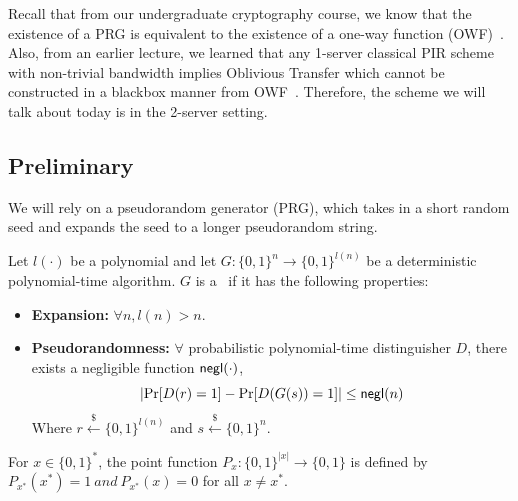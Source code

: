 Recall that 
from our undergraduate cryptography course, 
we know that the existence of a PRG
is equivalent to the existence of a one-way function (OWF)~\cite{haastad1999pseudorandom}.
Also, from an earlier lecture, we learned that any 1-server
classical PIR scheme 
with non-trivial bandwidth implies
Oblivious Transfer which cannot be constructed
in a blackbox manner from OWF~\cite{IR89}. 
Therefore, the scheme we will talk about today is in the 2-server setting.


\subsection{Preliminary}
We will rely on a pseudorandom generator (PRG),
which takes in a short random seed and expands
the seed to a longer pseudorandom string.

\begin{definition}[PRG]
    Let $l(\cdot)$ be a polynomial and let 
$G:  \{0,1\}^n \rightarrow \{0,1\}^{l(n)}$ be a deterministic
    polynomial-time algorithm. $G$ is a \Prg \ if it has the following properties:
    \hfill
    \begin{itemize}
        \item \textbf{Expansion:} $\forall n, l(n) > n$.
        \item \textbf{Pseudorandomness:} $\forall$ probabilistic polynomial-time distinguisher
$D$, there exists a negligible function ${\sf negl}(\cdot)$, 
        $$\left|\Pr[D(r) = 1] - \Pr[D(G(s)) = 1]\right| \leq {\sf negl}(n)$$ 
        Where $r \overset{{\scriptscriptstyle\$}}{\leftarrow} \{0,1\}^{l(n)}$ and
        $s \overset{{\scriptscriptstyle\$}}{\leftarrow} \{0,1\}^{n}$.
    \end{itemize}
\end{definition}


\begin{notation}
    For $x \in\{0,1\}^*$, the point function $P_{x}:\{0,1\}^{|{x}|} \rightarrow \{0,1\}$
    is defined by $P_{x^*}(x^*) = 1 \ and \ P_{x^*}(x) = 0$ for all $x \neq x^*$.
\end{notation}

